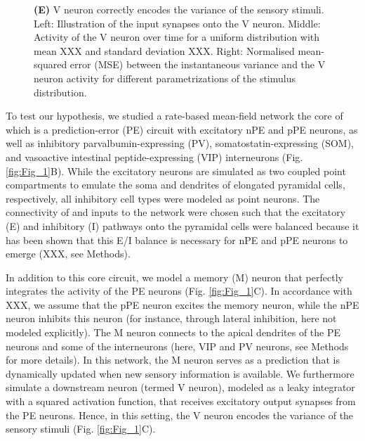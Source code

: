 \documentclass[10pt,a4paper,draft]{article}
\begin{document}
\begin{figure}[t!]
{{\bf (E)} V neuron correctly encodes the variance of the sensory stimuli. Left: Illustration of the input synapses onto the V neuron. Middle: Activity of the V neuron over time for a uniform distribution with mean XXX and standard deviation XXX. Right: Normalised mean-squared error (MSE) between the instantaneous variance and the V neuron activity for different parametrizations of the stimulus distribution.
}
\label{fig:Fig_2}
\end{figure}
%

To test our hypothesis, we studied a rate-based mean-field network the core of which is a prediction-error (PE) circuit with excitatory nPE and pPE neurons, as well as inhibitory parvalbumin-expressing (PV), somatostatin-expressing (SOM), and vasoactive intestinal peptide-expressing (VIP) interneurons (Fig. \ref{fig:Fig_1}B). While the excitatory neurons are simulated as two coupled point compartments to emulate the soma and dendrites of elongated pyramidal cells, respectively, all inhibitory cell types were modeled as point neurons. The connectivity of and inputs to the network were chosen such that the excitatory (E) and inhibitory (I) pathways onto the pyramidal cells were balanced because it has been shown that this E/I balance is necessary for nPE and pPE neurons to emerge (XXX, see Methods). 

In addition to this core circuit, we model a memory (M) neuron that perfectly integrates the activity of the PE neurons (Fig. \ref{fig:Fig_1}C). In accordance with XXX, we assume that the pPE neuron excites the memory neuron, while the nPE neuron inhibits this neuron (for instance, through lateral inhibition, here not modeled explicitly). The M neuron connects to the apical dendrites of the PE neurons and some of the interneurons (here, VIP and PV neurons, see Methods for more details). In this network, the M neuron serves as a prediction that is dynamically updated when new sensory information is available. We furthermore simulate a downstream neuron (termed V neuron), modeled as a leaky integrator with a squared activation function, that receives excitatory output synapses from the PE neurons. Hence, in this setting, the V neuron encodes the variance of the sensory stimuli (Fig. \ref{fig:Fig_1}C). 
\end{document}
